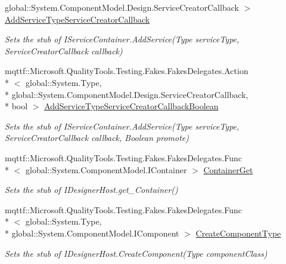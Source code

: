 \begin{DoxyCompactItemize}
global\-::\-System.\-Component\-Model.\-Design.\-Service\-Creator\-Callback $>$ \hyperlink{class_system_1_1_component_model_1_1_design_1_1_fakes_1_1_stub_i_designer_host_a3a11919df2b6d7217ee3c72906cda172}{Add\-Service\-Type\-Service\-Creator\-Callback}
\begin{DoxyCompactList}\small\item\em Sets the stub of I\-Service\-Container.\-Add\-Service(\-Type service\-Type, Service\-Creator\-Callback callback)\end{DoxyCompactList}\item 
mqttf\-::\-Microsoft.\-Quality\-Tools.\-Testing.\-Fakes.\-Fakes\-Delegates.\-Action\\*
$<$ global\-::\-System.\-Type, \\*
global\-::\-System.\-Component\-Model.\-Design.\-Service\-Creator\-Callback, \\*
bool $>$ \hyperlink{class_system_1_1_component_model_1_1_design_1_1_fakes_1_1_stub_i_designer_host_a7c7f8ec6c161f07b76cb64f00b01515c}{Add\-Service\-Type\-Service\-Creator\-Callback\-Boolean}
\begin{DoxyCompactList}\small\item\em Sets the stub of I\-Service\-Container.\-Add\-Service(\-Type service\-Type, Service\-Creator\-Callback callback, Boolean promote)\end{DoxyCompactList}\item 
mqttf\-::\-Microsoft.\-Quality\-Tools.\-Testing.\-Fakes.\-Fakes\-Delegates.\-Func\\*
$<$ global\-::\-System.\-Component\-Model.\-I\-Container $>$ \hyperlink{class_system_1_1_component_model_1_1_design_1_1_fakes_1_1_stub_i_designer_host_a83f0d7dd2233e1b9c6481da8041b02c1}{Container\-Get}
\begin{DoxyCompactList}\small\item\em Sets the stub of I\-Designer\-Host.\-get\-\_\-\-Container()\end{DoxyCompactList}\item 
mqttf\-::\-Microsoft.\-Quality\-Tools.\-Testing.\-Fakes.\-Fakes\-Delegates.\-Func\\*
$<$ global\-::\-System.\-Type, \\*
global\-::\-System.\-Component\-Model.\-I\-Component $>$ \hyperlink{class_system_1_1_component_model_1_1_design_1_1_fakes_1_1_stub_i_designer_host_a24c0a570468f4972e8902bada1ec19e8}{Create\-Component\-Type}
\begin{DoxyCompactList}\small\item\em Sets the stub of I\-Designer\-Host.\-Create\-Component(\-Type component\-Class)\end{DoxyCompactList}\item 

\end{DoxyCompactItemize}
